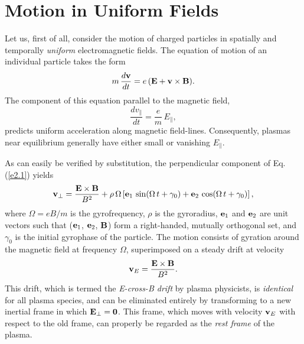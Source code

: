 \section{Motion in Uniform Fields}
Let us, first of all, consider the motion of charged particles
in spatially and temporally {\em uniform}\/ electromagnetic fields. 
The equation of motion of an individual particle takes the form
\begin{equation}\label{e2.1}
m\,\frac{d{\bf v}}{dt} = e\,({\bf E} + {\bf v}\times {\bf B}).
\end{equation}
The component of this equation parallel to the magnetic field,
\begin{equation}
\frac{d v_\parallel} {dt} = \frac{e}{m} \,E_\parallel,
\end{equation}
predicts uniform acceleration along magnetic field-lines. Consequently,
plasmas near equilibrium generally have either small or vanishing $E_\parallel$. 

As can easily be verified by substitution, the perpendicular component of
Eq. (\ref{e2.1}) yields
\begin{equation}
{\bf v}_\perp = \frac{{\bf E}\times{\bf B}}{B^2} + \rho\,{\Omega}
\left[ {\bf e}_1 \,\sin({\Omega}\, t +\gamma_0) + {\bf e}_2\,
 \cos({\Omega}\, t +\gamma_0)\right],
\end{equation}
where ${\Omega}=eB/m$ is the gyrofrequency, $\rho$ is the gyroradius, 
${\bf e}_1$ and ${\bf e}_2$
are unit vectors such that (${\bf e}_1$, ${\bf e}_2$, ${\bf B}$) form a
right-handed, mutually orthogonal set, and $\gamma_0$ is the initial
gyrophase of the particle. The motion consists of gyration around the
magnetic field at frequency ${\Omega}$, superimposed on a
steady drift at velocity
\begin{equation}\label{e2.4}
{\bf v}_E = \frac{{\bf E}\times{\bf B}}{B^2}.
\end{equation}
This drift, which is termed the {\em E-cross-B drift}\/ by plasma physicists,
is {\em identical}\/ for all plasma species, and can be eliminated entirely by
transforming to a new inertial frame in which ${\bf E}_\perp= {\bf 0}$. 
This frame, which moves with
velocity ${\bf v}_E$ with respect to the old frame, can properly be regarded as the {\em rest frame}\/ of the plasma. 

